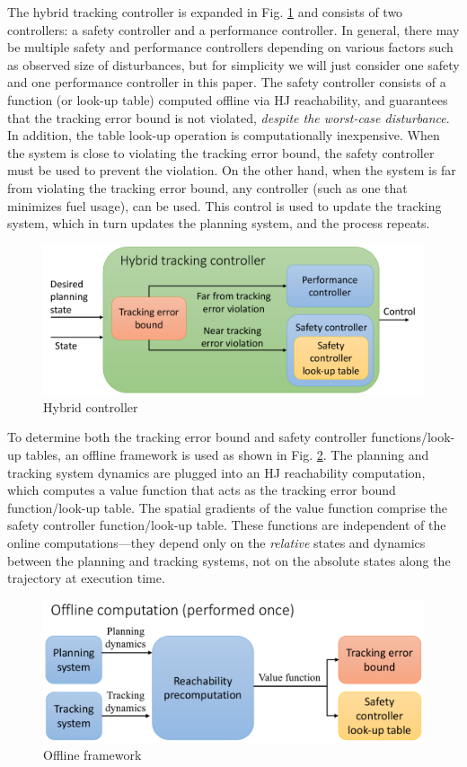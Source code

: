 The hybrid tracking controller is expanded in Fig. \ref{fig:hybrid_ctrl} and consists of two controllers: a safety controller and a performance controller. In general, there may be multiple safety and performance controllers depending on various factors such as observed size of disturbances, but for simplicity we will just consider one safety and one performance controller in this paper. The safety controller consists of a function (or look-up table) computed offline via HJ reachability, and guarantees that the tracking error bound is not violated, \textit{despite the worst-case disturbance}. In addition, the table look-up operation is computationally inexpensive. When the system is close to violating the tracking error bound, the safety controller must be used to prevent the violation. On the other hand, when the system is far from violating the tracking error bound, any controller (such as one that minimizes fuel usage), can be used. This control is used to update the tracking system, which in turn updates the planning system, and the process repeats.
\begin{figure}[h!]
  \centering
	\includegraphics[width=0.9\columnwidth]{fig/hybrid_controller}
	\caption{Hybrid controller}
	\label{fig:hybrid_ctrl}
	\vspace{-.1in}
\end{figure}

To determine both the tracking error bound and safety controller functions/look-up tables, an offline framework is used as shown in Fig. \ref{fig:fw_offline}. The planning and tracking system dynamics are plugged into an HJ reachability computation, which computes a value function that acts as the tracking error bound function/look-up table. The spatial gradients of the value function comprise the safety controller function/look-up table. These functions are independent of the online computations---they depend only on the \textit{relative} states and dynamics between the planning and tracking systems, not on the absolute states along the trajectory at execution time.
\begin{figure}[h!]
  \centering
	\includegraphics[width=0.9\columnwidth]{fig/framework_offline}
	\caption{Offline framework}
	\label{fig:fw_offline}
\end{figure}

